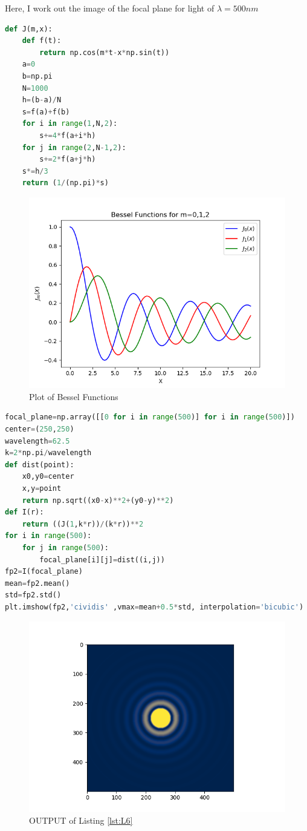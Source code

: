 Here, I work out the image of the focal plane for light of $\lambda=500 nm$
\begin{lstlisting}[language=Python, caption=Bessel Function, frame=single, label={lst:L5} ]
def J(m,x):
	def f(t):
		return np.cos(m*t-x*np.sin(t))
	a=0
	b=np.pi
	N=1000
	h=(b-a)/N
	s=f(a)+f(b)
	for i in range(1,N,2):
		s+=4*f(a+i*h)
	for j in range(2,N-1,2):
		s+=2*f(a+j*h)
	s*=h/3
	return (1/(np.pi)*s)
\end{lstlisting}
\begin{figure}[H]
	\centering
	\includegraphics[width=0.7\linewidth]{BesselFunction}
	\caption{Plot of Bessel Functions}
	\label{fig:besselfunction}
\end{figure}

\begin{lstlisting}[language=Python, caption=Main Function, frame=single, label={lst:L6} ]
focal_plane=np.array([[0 for i in range(500)] for i in range(500)])
center=(250,250)
wavelength=62.5
k=2*np.pi/wavelength
def dist(point):
	x0,y0=center
	x,y=point
	return np.sqrt((x0-x)**2+(y0-y)**2)  
def I(r):
	return ((J(1,k*r))/(k*r))**2
for i in range(500):
	for j in range(500):
		focal_plane[i][j]=dist((i,j))
fp2=I(focal_plane)
mean=fp2.mean()
std=fp2.std()
plt.imshow(fp2,'cividis' ,vmax=mean+0.5*std, interpolation='bicubic')
\end{lstlisting}
\newpage
\begin{figure}[H]
	\centering
	\includegraphics[width=0.7\linewidth]{DiffractionPattern}
	\caption{OUTPUT of Listing \ref{lst:L6}}
	\label{fig:diffractionpattern}
\end{figure}

